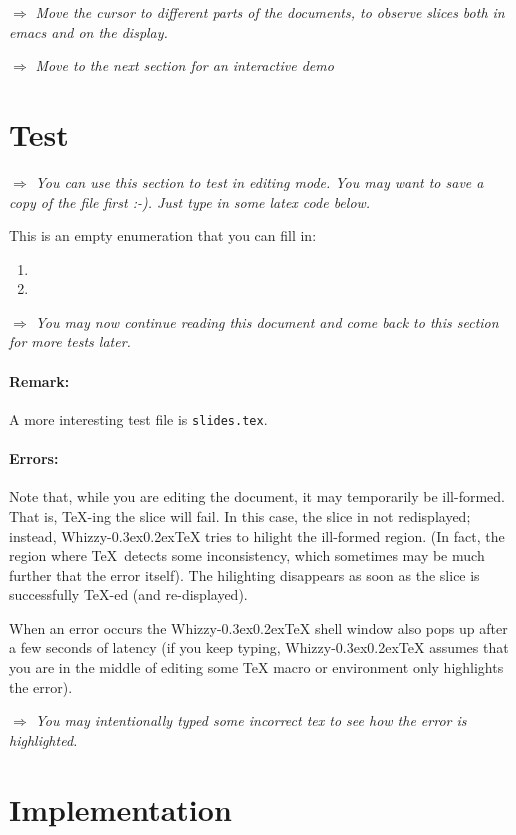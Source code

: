 \documentclass{article}
\let \lst \verb
\def \whizzy{{Whizzy\kern -0.3ex\raise 0.2ex\hbox{\TeX}}}
\def \instruction #1{\par\medskip \noindent$\Rightarrow$ {\em #1}}
\begin{document}
\instruction 
{Move the cursor to different parts of the documents, to observe 
slices both in emacs and on the display. }

\instruction {Move to the next section for an interactive demo}


\section {Test}

\instruction
{You can use this section to test in editing mode.
You may want to save a copy of the file first :-). 
Just type in some latex code below.}

This is an empty enumeration that you can fill in: 
\begin {enumerate}
\item
\item
\end {enumerate}

\instruction
{You may now continue reading this document and come back to this
section for more tests later.}

\paragraph{Remark:}
A more interesting test file is \lst"slides.tex".

\paragraph{Errors:}
Note that, while you are editing the document, it may temporarily be
ill-formed. That is, \TeX-ing the slice will fail. In this case, the slice in
not redisplayed; instead, {\whizzy} tries to hilight the ill-formed region.
(In fact, the region where \TeX\ detects some inconsistency, which sometimes
may be much further that the error itself). The hilighting disappears as
soon as the slice is successfully \TeX-ed (and re-displayed). 

When an error occurs the {\whizzy} shell window also pops up after a few
seconds of latency (if you keep typing, {\whizzy} assumes that you are in the
middle of editing some {\TeX} macro or environment only highlights the
error). 

\instruction
{You may intentionally typed some incorrect tex to see how the error is
highlighted.}


\section {Implementation}
\end{document}
